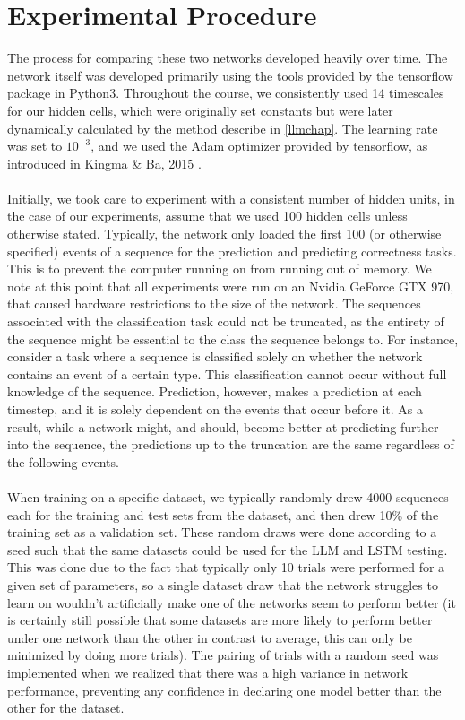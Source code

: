 \section{Experimental Procedure}
The process for comparing these two networks developed heavily over time. The network itself was developed primarily using the tools provided by the tensorflow package in Python3. Throughout the course, we consistently used 14 timescales for our hidden cells, which were originally set constants but were later dynamically calculated by the method describe in \ref{llmchap}. The learning rate was set to $10^{-3}$, and we used the Adam optimizer provided by tensorflow, as introduced in Kingma \& Ba, 2015 \cite{Adam}. \\\\Initially, we took care to experiment with a consistent number of hidden units, in the case of our experiments, assume that we used 100 hidden cells unless otherwise stated. Typically, the network only loaded the first 100 (or otherwise specified) events of a sequence for the prediction and predicting correctness tasks. This is to prevent the computer running on from running out of memory. We note at this point that all experiments were run on an Nvidia GeForce GTX 970, that caused hardware restrictions to the size of the network. The sequences associated with the classification task could not be truncated, as the entirety of the sequence might be essential to the class the sequence belongs to. For instance, consider a task where a sequence is classified solely on whether the network contains an event of a certain type. This classification cannot occur without full knowledge of the sequence. Prediction, however, makes a prediction at each timestep, and it is solely dependent on the events that occur before it. As a result, while a network might, and should, become better at predicting further into the sequence, the predictions up to the truncation are the same regardless of the following events. 
\\ \\When training on a specific dataset, we typically randomly drew 4000 sequences each for the training and test sets from the dataset, and then drew 10\% of the training set as a validation set. These random draws were done according to a seed such that the same datasets could be used for the LLM and LSTM testing. This was done due to the fact that typically only 10 trials were performed for a given set of parameters, so a single dataset draw that the network struggles to learn on wouldn't artificially make one of the networks seem to perform better (it is certainly still possible that some datasets are more likely to perform better under one network than the other in contrast to average, this can only be minimized by doing more trials). The pairing of trials with a random seed was implemented when we realized that there was a high variance in network performance, preventing any confidence in declaring one model better than the other for the dataset.
